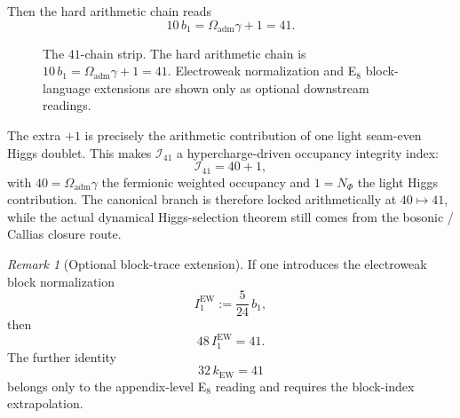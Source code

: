 \documentclass[11pt,a4paper]{article}
\theoremstyle{definition}
\theoremstyle{remark}
\newtheorem*{remark}{Remark}
\newcommand{\bone}{b_1}
\newcommand{\Oadm}{\Omega_{\mathrm{adm}}}
\begin{document}
Then the hard arithmetic chain reads
\begin{equation}
\label{eq:41-chain-main}
10\,\bone
=
\Oadm\gamma+1
=
41.
\end{equation}
\begin{figure}[t]
\centering
\footnotesize
{}
\caption{The $41$-chain strip. The hard arithmetic chain is $10\,\bone=\Oadm\gamma+1=41$. Electroweak normalization and E$_8$ block-language extensions are shown only as optional downstream readings.}
\label{fig:41-chain-strip}
\end{figure}
The extra $+1$ is precisely the arithmetic contribution of one light seam-even Higgs doublet. This makes $\mathcal I_{41}$ a hypercharge-driven occupancy integrity index:
\[
\mathcal I_{41}=40+1,
\]
with $40=\Oadm\gamma$ the fermionic weighted occupancy and $1=N_\Phi$ the light Higgs contribution. The canonical branch is therefore locked arithmetically at $40\mapsto 41$, while the actual dynamical Higgs-selection theorem still comes from the bosonic / Callias closure route.

\begin{remark}[Optional block-trace extension]
If one introduces the electroweak block normalization
\[
I_1^{\mathrm{EW}}:=\frac{5}{24}\,\bone,
\]
then
\[
48\,I_1^{\mathrm{EW}}=41.
\]
The further identity
\[
32\,k_{\mathrm{EW}}=41
\]
belongs only to the appendix-level E$_8$ reading and requires the block-index extrapolation.
\end{remark}
\end{document}
